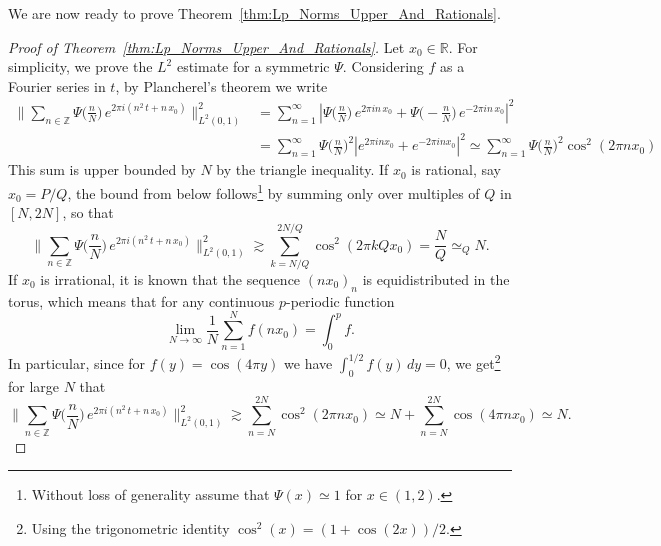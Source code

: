 \documentclass[11pt,reqno]{amsart}
\theoremstyle{definition}
\begin{document}
We are now ready to prove Theorem~\ref{thm:Lp_Norms_Upper_And_Rationals}. 
\begin{proof}[Proof of Theorem~\ref{thm:Lp_Norms_Upper_And_Rationals}]
Let $x_0 \in \mathbb R$. 
For simplicity, we prove the $L^2$ estimate for a symmetric $\Psi$. 
Considering $f$ as a Fourier series in $t$,  
by Plancherel's theorem we write
	\begin{equation}
	\begin{split}
	\Big\lVert  \sum_{n \in \mathbb Z} \Psi\big(\frac{n}{N}\big)\,  e^{2\pi i (n^2 \, t + n \, x_0)}  \Big\rVert_{L^2(0,1)}^2 
	& = \sum_{n =1}^\infty \left|  \Psi\big(\frac{n}{N}\big)\,e^{2\pi i  n \, x_0} + \Psi\big(-\frac{n}{N}\big)\,e^{-2\pi i  n \, x_0}  \right|^2 \\
	& = \sum_{n=1}^\infty \Psi\big(\frac{n}{N}\big)^2 \left|  e^{2\pi i n x_0} + e^{-2\pi i n x_0} \right|^2 
	 \simeq  \sum_{n=1}^\infty \Psi\big(\frac{n}{N}\big)^2 \cos^2 (2\pi n x_0) 
	\end{split}
	\end{equation}
This sum is upper bounded by $N$ by the triangle inequality. 
	If $x_0$ is rational, say $x_0 = P/Q$, 
	the bound from below follows\footnote{Without loss of generality assume that $\Psi(x) \simeq 1$ for $x \in (1,2)$.}
	by summing only over multiples of $Q$ in $[N,2N]$, so that 
	\begin{equation}\label{eq:LowerSumWithCosine}
	\Big\lVert  \sum_{n \in \mathbb Z} \Psi\big(\frac{n}{N}\big) \,  e^{2\pi i (n^2 \, t + n \, x_0)}  \Big\rVert_{L^2(0,1)}^2 
	 \gtrsim \sum_{ k = N/Q}^{2N/Q} \cos^2 (2\pi kQ x_0)
	 = \frac{N}{Q} \simeq_Q N. 
	\end{equation}		
	If $x_0$ is irrational, it is known that the sequence $(nx_0)_n$ is equidistributed in the torus, 
	which means that for any continuous $p$-periodic function 
	\begin{equation}
	\lim_{N \to \infty } \frac{1}{N} \sum_{n=1}^N f(nx_0)  = \int_0^p f.
	\end{equation}
	In particular, since for $f(y) = \cos(4\pi y)$ we have $\int_0^{1/2} f(y)\, dy=0$, we get\footnote{Using the trigonometric identity $\cos^2(x) = (1 + \cos (2x))/2$.}
	for large $N$ that
	\begin{equation}
	\Big\lVert  \sum_{n \in \mathbb Z} \Psi\big(\frac{n}{N}\big)\,  e^{2\pi i (n^2 \, t + n \, x_0)}  \Big\rVert_{L^2(0,1)}^2
	\gtrsim \sum_{n = N}^{2N} \cos^2 (2\pi n x_0)
	\simeq N +  \sum_{n = N}^{2N} \cos (4\pi n x_0)
	\simeq N.
	\end{equation}
	

\end{proof}
\end{document}
